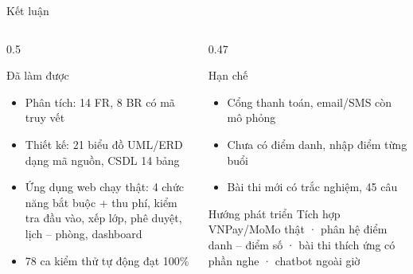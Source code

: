 \documentclass[aspectratio=169,11pt]{beamer}
\begin{document}
\begin{frame}{Kết luận}
  \begin{columns}[T]
    \begin{column}{0.5\linewidth}
      \begin{exampleblock}{Đã làm được}
        \begin{itemize}
          \item Phân tích: 14 FR, 8 BR có mã truy vết
          \item Thiết kế: 21 biểu đồ UML/ERD dạng mã nguồn, CSDL 14 bảng
          \item Ứng dụng web chạy thật: 4 chức năng bắt buộc + thu phí, kiểm tra đầu vào, xếp lớp, phê duyệt, lịch – phòng, dashboard
          \item 78 ca kiểm thử tự động đạt 100\%
        \end{itemize}
      \end{exampleblock}
    \end{column}
    \begin{column}{0.47\linewidth}
      \begin{alertblock}{Hạn chế}
        \begin{itemize}
          \item Cổng thanh toán, email/SMS còn mô phỏng
          \item Chưa có điểm danh, nhập điểm từng buổi
          \item Bài thi mới có trắc nghiệm, 45 câu
        \end{itemize}
      \end{alertblock}
      \begin{block}{Hướng phát triển}
        Tích hợp VNPay/MoMo thật · phân hệ điểm danh – điểm số · bài thi thích ứng có phần nghe · chatbot ngoài giờ
      \end{block}
    \end{column}
  \end{columns}
\end{frame}

\begin{frame}[plain]
\end{frame}
\end{document}
